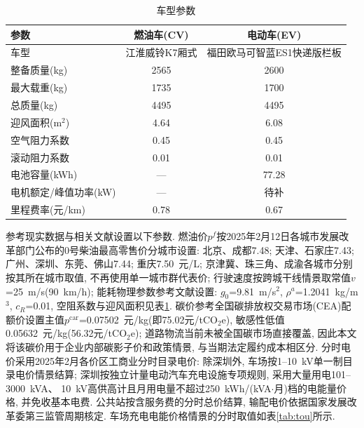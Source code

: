 \documentclass{setp-new}
\newcommand{\setptabsetup}{\fontsize{9pt}{10.5pt}\selectfont\renewcommand{\arraystretch}{0.95}\setlength{\tabcolsep}{2.2pt}\setlength{\aboverulesep}{0.4pt}\setlength{\belowrulesep}{0.4pt}\hbadness=10000}
\begin{document}
\begin{table}[H]
\centering
\caption{车型参数}
\label{tab:vehicle}
\setptabsetup
\begin{tabular*}{\linewidth}{@{\extracolsep{\fill}}lcc@{}}
\toprule
参数 & 燃油车(CV) & 电动车(EV)\\
\midrule
车型             & 江淮威铃K7厢式 & 福田欧马可智蓝ES1快递版栏板\\
整备质量(kg)     & 2565 & 2600\\
最大载重(kg)     & 1735 & 1700\\
总质量(kg)       & 4495 & 4495\\
迎风面积(m$^2$)  & 4.64 & 6.08\\
空气阻力系数     & 0.45 & 0.45\\
滚动阻力系数     & 0.01 & 0.01\\
电池容量(kWh)    & --- & 77.28\\
电机额定/峰值功率(kW) & --- & 待补\\
里程费率(元/km)  & 0.78 & 0.67\\
\bottomrule
\end{tabular*}
\end{table}

参考现实数据与相关文献设置以下参数.
燃油价$p^f$按2025年2月12日各城市发展改革部门公布的0号柴油最高零售价分城市设置:
北京、成都7.48; 天津、石家庄7.43; 广州、深圳、东莞、佛山7.44; 重庆7.50~元/L;
京津冀、珠三角、成渝各城市分别按其所在城市取值, 不再使用单一城市群代表价;
行驶速度按跨城干线情景取常值$v$=25~m/s(90~km/h);
能耗物理参数参考文献\cite{ref:27,ref:36}设置:
$g_0$=9.81~m/s$^2$, $\rho^a$=1.2041~kg/m$^3$, $c_R$=0.01, 空阻系数与迎风面积见表\ref{tab:vehicle}.
碳价参考全国碳排放权交易市场(CEA)配额价\cite{ref:87}设置主值$p^{\mathrm{car}}$=0.07502~元/kg(即75.02元/tCO$_2$e),
敏感性低值0.05632~元/kg(56.32元/tCO$_2$e);
道路物流当前未被全国碳市场直接覆盖, 因此本文将该碳价用于企业内部碳影子价和政策情景, 与当期法定履约成本相区分.
分时电价采用2025年2月各价区工商业分时目录电价:
除深圳外, 车场按1--10~kV单一制目录电价情景结算;
深圳按独立计量电动汽车充电设施专项规则, 采用大量用电101--3000~kVA、
10~kV高供高计且月用电量不超过250~kWh/(kVA$\cdot$月)档的电能量价格,
并免收基本电费\cite{ref:88}.
公共站按含服务费的分时总价结算, 输配电价依据国家发展改革委第三监管周期核定\cite{ref:83}.
车场充电电能价格情景的分时取值如表\ref{tab:tou}所示.
\end{document}
